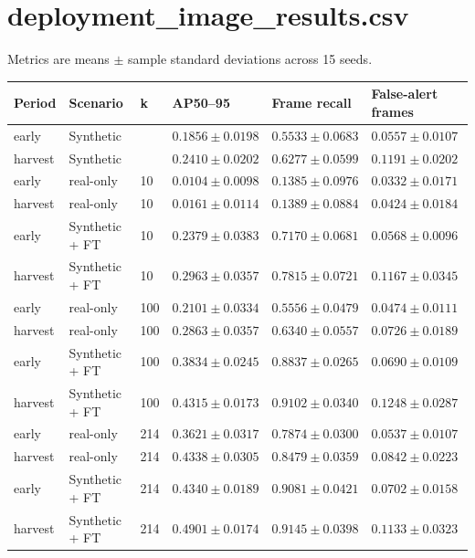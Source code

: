 \documentclass{article}
\begin{document}
\section*{deployment\_image\_results.csv}
Metrics are means $\pm$ sample standard deviations across 15 seeds.\par\medskip
\begin{lrbox}{\resulttable}\begin{tabular}{llllll}
\toprule
Period & Scenario & k & AP50--95 & Frame recall & False-alert frames \\
\midrule
early & Synthetic &  & $0.1856 \pm 0.0198$ & $0.5533 \pm 0.0683$ & $0.0557 \pm 0.0107$ \\
harvest & Synthetic &  & $0.2410 \pm 0.0202$ & $0.6277 \pm 0.0599$ & $0.1191 \pm 0.0202$ \\
early & real-only & 10 & $0.0104 \pm 0.0098$ & $0.1385 \pm 0.0976$ & $0.0332 \pm 0.0171$ \\
harvest & real-only & 10 & $0.0161 \pm 0.0114$ & $0.1389 \pm 0.0884$ & $0.0424 \pm 0.0184$ \\
early & Synthetic + FT & 10 & $0.2379 \pm 0.0383$ & $0.7170 \pm 0.0681$ & $0.0568 \pm 0.0096$ \\
harvest & Synthetic + FT & 10 & $0.2963 \pm 0.0357$ & $0.7815 \pm 0.0721$ & $0.1167 \pm 0.0345$ \\
early & real-only & 100 & $0.2101 \pm 0.0334$ & $0.5556 \pm 0.0479$ & $0.0474 \pm 0.0111$ \\
harvest & real-only & 100 & $0.2863 \pm 0.0357$ & $0.6340 \pm 0.0557$ & $0.0726 \pm 0.0189$ \\
early & Synthetic + FT & 100 & $0.3834 \pm 0.0245$ & $0.8837 \pm 0.0265$ & $0.0690 \pm 0.0109$ \\
harvest & Synthetic + FT & 100 & $0.4315 \pm 0.0173$ & $0.9102 \pm 0.0340$ & $0.1248 \pm 0.0287$ \\
early & real-only & 214 & $0.3621 \pm 0.0317$ & $0.7874 \pm 0.0300$ & $0.0537 \pm 0.0107$ \\
harvest & real-only & 214 & $0.4338 \pm 0.0305$ & $0.8479 \pm 0.0359$ & $0.0842 \pm 0.0223$ \\
early & Synthetic + FT & 214 & $0.4340 \pm 0.0189$ & $0.9081 \pm 0.0421$ & $0.0702 \pm 0.0158$ \\
harvest & Synthetic + FT & 214 & $0.4901 \pm 0.0174$ & $0.9145 \pm 0.0398$ & $0.1133 \pm 0.0323$ \\
\bottomrule
\end{tabular}\end{lrbox}
\noindent\ifdim\wd\resulttable>\linewidth\resizebox{.99\linewidth}{!}{\usebox{\resulttable}}\else\usebox{\resulttable}\fi
\clearpage
\end{document}
